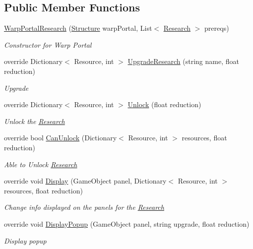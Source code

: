 \subsection*{Public Member Functions}
\begin{DoxyCompactItemize}
\item 
\hyperlink{class_warp_portal_research_a06e5e8459b41aaf0f94636690d991fee}{Warp\+Portal\+Research} (\hyperlink{class_structure}{Structure} warp\+Portal, List$<$ \hyperlink{class_research}{Research} $>$ prereqs)
\begin{DoxyCompactList}\small\item\em Constructor for Warp Portal \end{DoxyCompactList}\item 
override Dictionary$<$ Resource, int $>$ \hyperlink{class_warp_portal_research_a2571a9c698b8874910de790e6d610a17}{Upgrade\+Research} (string name, float reduction)
\begin{DoxyCompactList}\small\item\em Upgrade \end{DoxyCompactList}\item 
override Dictionary$<$ Resource, int $>$ \hyperlink{class_warp_portal_research_a8692eb6be00975f366a2c53b1c84d55d}{Unlock} (float reduction)
\begin{DoxyCompactList}\small\item\em Unlock the \hyperlink{class_research}{Research} \end{DoxyCompactList}\item 
override bool \hyperlink{class_warp_portal_research_a49cdb8cdefd5302ee3f12e3dc45ca027}{Can\+Unlock} (Dictionary$<$ Resource, int $>$ resources, float reduction)
\begin{DoxyCompactList}\small\item\em Able to Unlock \hyperlink{class_research}{Research} \end{DoxyCompactList}\item 
override void \hyperlink{class_warp_portal_research_a2cd1bc8ac2783f9e412cddd55a4a3404}{Display} (Game\+Object panel, Dictionary$<$ Resource, int $>$ resources, float reduction)
\begin{DoxyCompactList}\small\item\em Change info displayed on the panels for the \hyperlink{class_research}{Research} \end{DoxyCompactList}\item 
override void \hyperlink{class_warp_portal_research_a41ca04d145f6522119839b5d9062f171}{Display\+Popup} (Game\+Object panel, string upgrade, float reduction)
\begin{DoxyCompactList}\small\item\em Display popup \end{DoxyCompactList}\end{DoxyCompactItemize}
